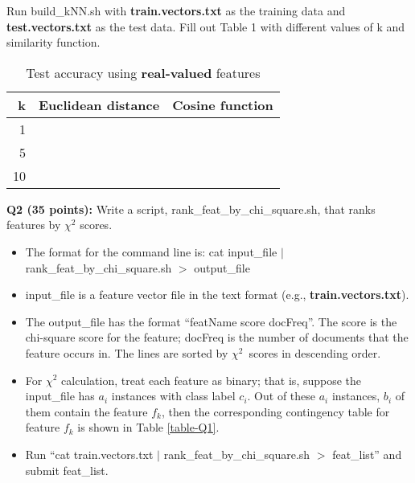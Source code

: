\documentclass[11pt]{article}
\begin{document}
Run build\_kNN.sh with {\bf train.vectors.txt} as the 
training data and {\bf test.vectors.txt} as the test data.
Fill out Table 1 with different values of k and similarity function.


\begin{table}[h]
\centering
\caption{Test accuracy using {\bf real-valued} features} 
\label{table1}
\begin{tabular}{|r|l|l|} \hline
k  & Euclidean distance & Cosine function \\ \hline
1       &  &    \\ \hline
5       &  &    \\ \hline
10      &  &    \\ \hline
\end{tabular}
\end{table}


\vspace{0.4in}
\noindent
{\bf Q2 (35 points):} Write a script, rank\_feat\_by\_chi\_square.sh, that ranks
          features by $\chi^2$ scores. 
\begin{itemize}
   \item The format for the command line is: cat input\_file $\mid$ rank\_feat\_by\_chi\_square.sh $>$ output\_file
   
   \item input\_file is a feature vector file in the text format
         (e.g., {\bf train.vectors.txt}).

   \item The output\_file has the format ``featName score docFreq''. 
         The score is the chi-square score for the feature; docFreq
         is the number of documents that the feature occurs in.
         The lines are sorted by  $\chi^2$\ scores in descending order. 

   \item For $\chi^2$ calculation, treat each feature as binary; 
          that is, suppose the input\_file has $a_i$ instances
          with class label $c_i$. Out of these $a_i$ 
          instances, $b_i$ of them contain the feature $f_k$, 
          then the corresponding contingency table for 
          feature $f_k$ is shown in Table \ref{table-Q1}.

   \item Run ``cat train.vectors.txt $\mid$ rank\_feat\_by\_chi\_square.sh $>$ feat\_list'' and submit feat\_list.

\end{itemize}
\end{document}

